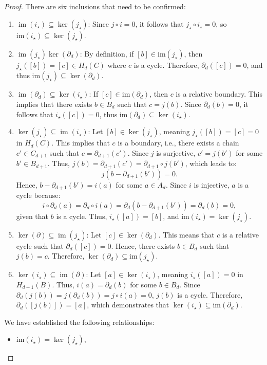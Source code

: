 \begin{proof}
	There are six inclusions that need to be confirmed:
	\begin{enumerate}
		\item $\operatorname{im}(i_{\star}) \subseteq \ker(j_{\star})$: Since
			$j \circ i = 0$, it follows that $j_{\star} \circ i_{\star} = 0$, so
			$\mathrm{im}(i_{\star}) \subseteq \ker(j_{\star})$.

		\item $\operatorname{im}(j_{\star}) \ker(\partial_{d})$: By definition, if $[
			b] \in \mathrm{im}(j_{\star})$, then $j_{\star}([b]) = [c] \in H_{d}(C)$
			where $c$ is a cycle. Therefore, $\partial_{d}([c]) = 0$, and thus $\mathrm{im}
			(j_{\star}) \subseteq \ker(\partial_{d})$.

		\item $\operatorname{im}(\partial_{d}) \subseteq \ker(i_{\star})$: If
			$[c] \in \mathrm{im}(\partial_{d})$, then $c$ is a relative boundary. This
			implies that there exists $b \in B_{d}$ such that $c = j(b)$. Since $\partial
			_{d}(b) = 0$, it follows that $i_{\star}([c]) = 0$, thus $\mathrm{im}(\partial
			_{d}) \subseteq \ker(i_{\star})$.

		\item $\ker(j_{\star}) \subseteq \operatorname{im}(i_{\star})$: Let
			$[b] \in \ker(j_{\star})$, meaning $j_{\star}([b]) = [c] = 0$ in $H_{d}(C)$.
			This implies that $c$ is a boundary, i.e., there exists a chain $c' \in C_{d+1}$
			such that $c = \partial_{d+1}(c')$. Since $j$ is surjective, $c' = j(b')$ for
			some $b' \in B_{d+1}$. Thus, $j(b) = \partial_{d+1}(c') = \partial_{d+1}\circ
			j(b')$, which leads to:
			\[
				j(b - \partial_{d+1}(b')) = 0.
			\]
			Hence, $b - \partial_{d+1}(b') = i(a)$ for some $a \in A_{d}$. Since $i$ is
			injective, $a$ is a cycle because:
			\[
				i \circ \partial_{d}(a) = \partial_{d} \circ i(a) = \partial_{d}(b - \partial
				_{d+1}(b')) = \partial_{d}(b) = 0,
			\]
			given that $b$ is a cycle. Thus, $i_{\star}([a]) = [b]$, and
			$\mathrm{im}(i_{\star}) = \ker(j_{\star})$.

		\item $\ker(\partial) \subseteq \operatorname{im}(j_{\star})$: Let
			$[c] \in \ker(\partial_{d})$. This means that $c$ is a relative cycle such
			that $\partial_{d}([c]) = 0$. Hence, there exists $b \in B_{d}$ such that $j
			(b) = c$. Therefore, $\ker(\partial_{d}) \subseteq \mathrm{im}(j_{\star})$.

		\item $\ker(i_{\star}) \subseteq \operatorname{im}(\partial)$: Let
			$[a] \in \ker(i_{\star})$, meaning $i_{\star}([a]) = 0$ in $H_{d-1}(B)$.
			Thus, $i(a) = \partial_{d}(b)$ for some $b \in B_{d}$. Since
			$\partial_{d}(j(b)) = j(\partial_{d}(b)) = j \circ i(a) = 0$, $j(b)$ is a cycle.
			Therefore, $\partial_{d}([j(b)]) = [a]$, which demonstrates that
			$\ker(i_{\star}) \subseteq \mathrm{im}(\partial_{d})$.
	\end{enumerate}
	We have established the following relationships:
	\begin{itemize}
		\item $\mathrm{im}(i_{\star}) = \ker(j_{\star})$,


\end{itemize}
\end{proof}
